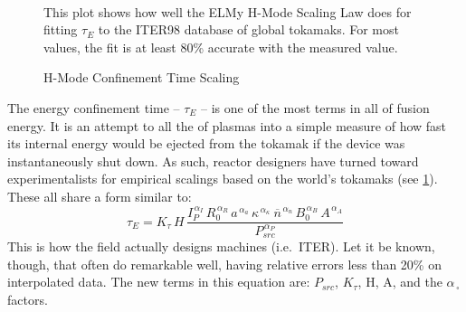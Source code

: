 \begin{figure}
	\centering
	\begin{adjustbox}{width=0.75\textwidth}
		
	\end{adjustbox}
	\caption{H-Mode Confinement Time Scaling} ~\\
	\small This plot shows how well the ELMy H-Mode Scaling Law does for fitting $\tau_E$ to the ITER98 database of global tokamaks. For most values, the fit is at least 80\% accurate with the measured value.\cite{tau_iter} 
	\label{fig:elmy}
\end{figure}

The energy confinement time -- $\tau_E$ -- is one of the most  terms in all of fusion energy. It is an attempt to  all the  of plasmas into a simple measure of how fast its internal energy would be ejected from the tokamak if the device was instantaneously shut down. As such, reactor designers have turned toward experimentalists for empirical scalings based on the world's tokamaks (see \cref{fig:elmy}). These all share a form similar to:
\begin{equation}
	\tau_E = K_\tau \, H \, \frac{
		I_P^{\,\alpha_I} \, R_0^{\,\alpha_R} \, a^{\,\alpha_a} \, \kappa^{\,\alpha_\kappa} \ \overline{n}^{\,\alpha_n} \, B_0^{\,\alpha_B} \, A^{\,\alpha_A}
	}{ P_{src} ^ {\,\alpha_P} }
	\label{eq:tau_gen}
\end{equation}
This  is how the field actually designs machines (i.e.\ ITER). Let it be known, though, that  often do remarkable well, having relative errors less than 20\% on interpolated data. The new terms in this equation are: $P_{src}$, $K_\tau$, H, A, and the $\alpha_{\,\square}$ factors. 

